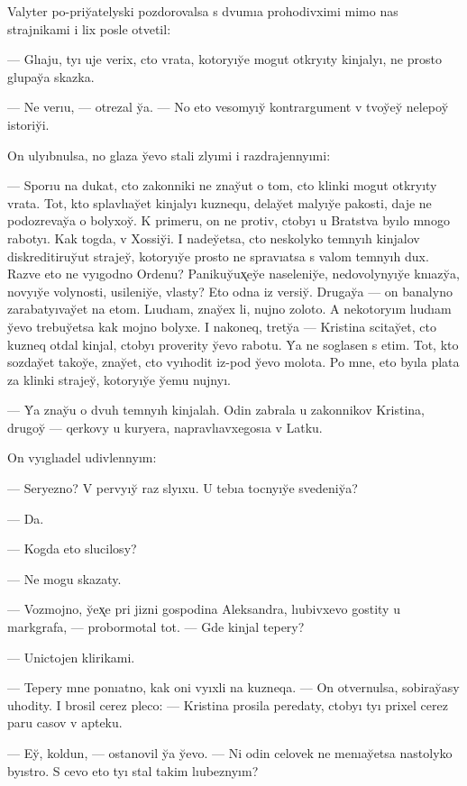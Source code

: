 \documentclass[10pt]{book}
\begin{document}
Valyter po-priy̆atelyski pozdorovalsa s dvumıa prohodivximi mimo nas strajnikami i lix posle otvetil:

— Glıaju, tyı uje verix, cto vrata, kotoryıy̆e mogut otkryıty kinjalyı, ne prosto glupay̆a skazka.

— Ne verıu, — otrezal y̆a. — No eto vesomyıy̆ kontrargument v tvoy̆ey̆ nelepoy̆ istoriy̆i.

On ulyıbnulsa, no glaza y̆evo stali zlyımi i razdrajennyımi:

— Sporıu na dukat, cto zakonniki ne znay̆ut o tom, cto klinki mogut otkryıty vrata. Tot, kto splavlıay̆et kinjalyı kuznequ, delay̆et malyıy̆e pakosti, daje ne podozrevay̆a o bolyxoy̆. K primeru, on ne protiv, ctobyı u Bratstva byılo mnogo rabotyı. Kak togda, v Xossiy̆i. I nadey̆etsa, cto neskolyko temnyıh kinjalov diskreditiruy̆ut strajey̆, kotoryıy̆e prosto ne spravıatsa s valom temnyıh dux. Razve eto ne vyıgodno Ordenu? Panikuy̆ux̨ey̆e naseleniy̆e, nedovolynyıy̆e knıazy̆a, novyıy̆e volynosti, usileniy̆e, vlasty? Eto odna iz versiy̆. Drugay̆a — on banalyno zarabatyıvay̆et na etom. Lıudıam, znay̆ex li, nujno zoloto. A nekotoryım lıudıam y̆evo trebuy̆etsa kak mojno bolyxe. I nakoneq, trety̆a — Kristina scitay̆et, cto kuzneq otdal kinjal, ctobyı proverity y̆evo rabotu. Y̆a ne soglasen s etim. Tot, kto sozday̆et takoy̆e, znay̆et, cto vyıhodit iz-pod y̆evo molota. Po mne, eto byıla plata za klinki strajey̆, kotoryıy̆e y̆emu nujnyı.

— Y̆a znay̆u o dvuh temnyıh kinjalah. Odin zabrala u zakonnikov Kristina, drugoy̆ — qerkovy u kuryera, napravlıavxegosıa v Latku.

On vyıglıadel udivlennyım:

— Seryezno? V pervyıy̆ raz slyıxu. U tebıa tocnyıy̆e svedeniy̆a?

— Da.

— Kogda eto slucilosy?

— Ne mogu skazaty.

— Vozmojno, y̆ex̨e pri jizni gospodina Aleksandra, lıubivxevo gostity u markgrafa, — probormotal tot. — Gde kinjal tepery?

— Unictojen klirikami.

— Tepery mne ponıatno, kak oni vyıxli na kuzneqa. — On otvernulsa, sobiray̆asy uhodity. I brosil cerez pleco: — Kristina prosila peredaty, ctobyı tyı prixel cerez paru casov v apteku.

— Ey̆, koldun, — ostanovil y̆a y̆evo. — Ni odin celovek ne menıay̆etsa nastolyko byıstro. S cevo eto tyı stal takim lıubeznyım?
\end{document}
